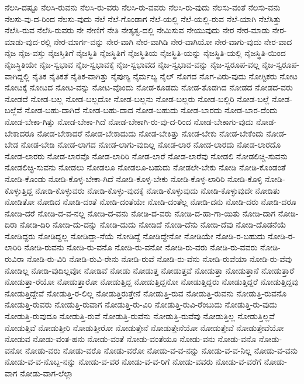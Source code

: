 {ನೆಲಸಿ-ದಷ್ಟೂ
ನೆಲಸಿ-ರುವನು
ನೆಲಸಿ-ರು-ವರು
ನೆಲಸಿ-ರು-ವವರು
ನೆಲಸಿ-ರು-ವುದು
ನೆಲಸು-ವಂತೆ
ನೆಲಸು-ವನು
ನೆಲಸು-ವು-ದ-ರಿಂದ
ನೆಲಸು-ವುದು
ನೆಲೆ
ನೆಲೆ-ಗೊಂಡಾಗ
ನೆಲೆ-ಯಲ್ಲಿ
ನೆಲೆ-ಯಲ್ಲಿ-ರುವ
ನೆಲೆ-ಯಾಗಿ
ನೆಲೆಸಿತ್ತು
ನೆಲೆಸಿ-ರುವ
ನೆಲೆಸಿ-ರುವರು
ನೇ
ನೇಣಿಗೆ
ನೇತಿ
ನೇತೃತ್ವ-ದಲ್ಲಿ
ನೇಮಿಸುವ
ನೇಯುವುದು
ನೇರ
ನೇರ-ಮಾಡು
ನೇರ-ಮಾಡು-ವುದ-ರಲ್ಲಿ
ನೇರ-ಮಾರ್ಗ-ವನ್ನು
ನೇರ-ವಾಗಿ
ನೇರ-ವಾಗಿಡಿ
ನೇರ-ವಾಗಿಯೋ
ನೇರ-ವಾಗು-ವುದು
ನೇರ-ವಾದ
ನೈಜ
ನೈಜ-ವಸ್ತು
ನೈಜಸ್ತಿತಿಗೆ
ನೈಜಸ್ಥಿತಿ
ನೈಜಸ್ಥಿತಿಗೆ
ನೈಜಸ್ಥಿತಿಯ
ನೈಜಸ್ಥಿತಿ-ಯನ್ನು
ನೈಜಸ್ಥಿತಿ-ಯಲ್ಲಿ
ನೈಜಸ್ಥಿತಿ-ಯಿಂದ
ನೈಜಸ್ಥಿತಿಯೇ
ನೈಜ-ಸ್ವಭಾವ
ನೈಜ-ಸ್ವಭಾವಕ್ಕೆ
ನೈಜ-ಸ್ವಭಾವದ
ನೈಜ-ಸ್ವಭಾವ-ವನ್ನು
ನೈಜ-ಸ್ವರೂಪ-ವಲ್ಲ
ನೈಜ-ಸ್ವರೂಪ-ವಾಗಿದ್ದಲ್ಲಿ
ನೈತಿಕ
ನೈತಿಕತೆ
ನೈತಿಕ-ವಾಗಿತ್ತು
ನೈಪುಣ್ಯ
ನೈರ್ಮಲ್ಯ
ನೈಲ್
ನೊಗದ
ನೊಗ-ವಿರು-ವುದು
ನೋಗ್ಟಿಕರು
ನೋಟ
ನೋಟಕ್ಕೆ
ನೋಟದ
ನೋಟ-ವನ್ನು
ನೋಟ-ವೊಂದು
ನೋಡ-ಕೂಡದು
ನೋಡ-ತೊಡಗಿದ
ನೋಡದ
ನೋಡದ-ವರು
ನೋಡದೆ
ನೋಡ-ಬಲ್ಲ
ನೋಡ-ಬಲ್ಲದೋ
ನೋಡ-ಬಲ್ಲನು
ನೋಡ-ಬಲ್ಲರು
ನೋಡ-ಬಲ್ಲಿರಿ
ನೋಡ-ಬಲ್ಲೆ
ನೋಡ-ಬಲ್ಲೆವೆ
ನೋಡ-ಬಹು-ದಾಗಿದೆ
ನೋಡ-ಬಹು-ದಾದ
ನೋಡ-ಬಹುದು
ನೋಡ-ಬಾರದು
ನೋಡ-ಬಾರ-ದೆಂದು
ನೋಡ-ಬೇಕಾ-ಗಿತ್ತು
ನೋಡ-ಬೇಕಾ-ಗಿದೆ
ನೋಡ-ಬೇಕಾಗಿ-ರು-ವು-ದ-ರಿಂದ
ನೋಡ-ಬೇಕಾಗು-ವುದು
ನೋಡ-ಬೇಕಾದರೂ
ನೋಡ-ಬೇಕಾದರೆ
ನೋಡ-ಬೇಕಾದುದು
ನೋಡ-ಬೇಕಿತ್ತು
ನೋಡ-ಬೇಕು
ನೋಡ-ಬೇಕೆಂದು
ನೋಡ-ಬೇಡ
ನೋಡ-ಬೇಡಿ
ನೋಡ-ಲಾಗದ
ನೋಡ-ಲಾಗು-ವುದಿಲ್ಲ
ನೋಡ-ಲಾರ
ನೋಡ-ಲಾರದು
ನೋಡ-ಲಾರದೊ
ನೋಡ-ಲಾರರು
ನೋಡ-ಲಾರವೊ
ನೋಡ-ಲಾರಿರಿ
ನೋಡ-ಲಾರೆ
ನೋಡ-ಲಾರೆವು
ನೋಡಲಿ
ನೋಡಲಿಚ್ಚಿ-ಸುವನು
ನೋಡಲಿಚ್ಛಿ-ಸುವನು
ನೋಡಲು
ನೋಡಲೂ
ನೋಡಲೂ-ಬಹುದು
ನೋಡಲೇ-ಬೇಕು
ನೋಡಿ
ನೋಡಿ-ಕೊಂಡಂತೆ
ನೋಡಿ-ಕೊಂಡು
ನೋಡಿ-ಕೊಳ್ಳ-ಬೇಕಾ-ಗಿದೆ
ನೋಡಿ-ಕೊಳ್ಳ-ಬೇಕು
ನೋಡಿ-ಕೊಳ್ಳ-ಲಾರಿರಿ
ನೋಡಿ-ಕೊಳ್ಳಿ
ನೋಡಿ-ಕೊಳ್ಳುತ್ತಿದ್ದ
ನೋಡಿ-ಕೊಳ್ಳುವರು
ನೋಡಿ-ಕೊಳ್ಳು-ವುದಕ್ಕೆ
ನೋಡಿ-ಕೊಳ್ಳುವುದು
ನೋಡಿ-ಕೊಳ್ಳುವುದೇ
ನೋಡಿತು
ನೋಡಿತೋ
ನೋಡಿದ
ನೋಡಿ-ದಂತೆ
ನೋಡಿ-ದಂತೆಯೇ
ನೋಡಿ-ದಂತೆಲ್ಲ
ನೋಡಿ-ದನು
ನೋಡಿ-ದರು
ನೋಡಿ-ದರೂ
ನೋಡಿ-ದರೆ
ನೋಡಿ-ದ-ವ-ನಲ್ಲ
ನೋಡಿ-ದ-ವನು
ನೋಡಿ-ದ-ವರು
ನೋಡಿ-ದ-ಹಾ-ಗಾ-ಯಿತು
ನೋಡಿ-ದಾಗ
ನೋಡಿ-ದಿರಾ
ನೋಡಿ-ದಿರಿ
ನೋಡಿ-ದು-ದನ್ನು
ನೋಡಿ-ದುದು
ನೋಡಿದೆ
ನೋಡಿ-ದೆನು
ನೋಡಿ-ದೆವು
ನೋಡಿ-ದೊಡನೆಯೆ
ನೋಡಿದ್ದರು
ನೋಡಿದ್ದಲ್ಲ
ನೋಡಿದ್ದಾ-ನೆಯೆ
ನೋಡಿದ್ದೆ
ನೋಡಿದ್ದೇನೋ
ನೋಡಿಯೇ
ನೋಡಿ-ರ-ಬಹುದು
ನೋಡಿ-ರ-ಲಾರಿರಿ
ನೋಡಿ-ರುವನು
ನೋಡಿ-ರು-ವನೊ
ನೋಡಿ-ರು-ವನೋ
ನೋಡಿ-ರು-ವರು
ನೋಡಿ-ರು-ವವರು
ನೋಡಿ-ರುವಿರಾ
ನೋಡಿ-ರು-ವಿರಿ
ನೋಡಿ-ರುವಿ-ರೇನು
ನೋಡಿ-ರುವೆ
ನೋಡಿ-ರು-ವೆನು
ನೋಡಿ-ರುವೆಯಾ
ನೋಡಿ-ರು-ವೆವು
ನೋಡಿಲ್ಲ
ನೋಡಿ-ವುದಿಲ್ಲವೋ
ನೋಡಿವೆ
ನೋಡು
ನೋಡುತ್ತ
ನೋಡುತ್ತವೆ
ನೋಡುತ್ತಾ
ನೋಡುತ್ತಾನೆ
ನೋಡುತ್ತಾರೆ
ನೋಡುತ್ತಾ-ರೆಯೋ
ನೋಡುತ್ತಾರೋ
ನೋಡುತ್ತಿದ್ದ
ನೋಡುತ್ತಿದ್ದನೋ
ನೋಡುತ್ತಿದ್ದರು
ನೋಡುತ್ತಿದ್ದರೆ
ನೋಡುತ್ತಿದ್ದವು
ನೋಡುತ್ತಿದ್ದೇವೆ
ನೋಡುತ್ತಿ-ರ-ಲಿಲ್ಲ
ನೋಡುತ್ತಿರುತ್ತೇನೆ
ನೋಡುತ್ತಿ-ರುವ
ನೋಡುತ್ತಿ-ರುವನು
ನೋಡುತ್ತಿ-ರುವನೊ
ನೋಡುತ್ತಿ-ರುವರು
ನೋಡುತ್ತಿ-ರುವಾಗ
ನೋಡುತ್ತಿ-ರು-ವಿರಿ
ನೋಡುತ್ತಿ-ರುವಿ-ರೆಂಬುದು
ನೋಡುತ್ತಿ-ರು-ವುದು
ನೋಡುತ್ತಿ-ರುವುದೂ
ನೋಡುತ್ತಿ-ರುವೆ
ನೋಡುತ್ತಿ-ರುವೆನು
ನೋಡುತ್ತಿ-ರುವೆವು
ನೋಡುತ್ತಿಲ್ಲ
ನೋಡುತ್ತಿಲ್ಲವೆ
ನೋಡುತ್ತಿವೆ
ನೋಡುತ್ತೀರಿ
ನೋಡುತ್ತೀರೋ
ನೋಡುತ್ತೇನೆ
ನೋಡುತ್ತೇನೆಯೋ
ನೋಡುತ್ತೇವೆ
ನೋಡುತ್ತೇವೆಯೋ
ನೋಡುವ
ನೋಡು-ವಂತ-ಹನು
ನೋಡು-ವಂತೆ
ನೋಡು-ವಂತೆಯೂ
ನೋಡು-ವನು
ನೋಡು-ವನೊ
ನೋಡು-ವನೋ
ನೋಡು-ವರು
ನೋಡು-ವರೊ
ನೋಡು-ವರೋ
ನೋಡು-ವ-ವ-ನನ್ನು
ನೋಡು-ವ-ವ-ನಿಲ್ಲ
ನೋಡು-ವ-ವನು
ನೋಡು-ವ-ವ-ನೊಬ್ಬ-ನನ್ನು
ನೋಡು-ವ-ವರ
ನೋಡು-ವ-ವ-ರಿಗೆ
ನೋಡು-ವವರು
ನೋಡು-ವ-ವರೆಗೆ
ನೋಡು-ವಾಗ
ನೋಡು-ವಾಗ-ಲೆಲ್ಲಾ
}
